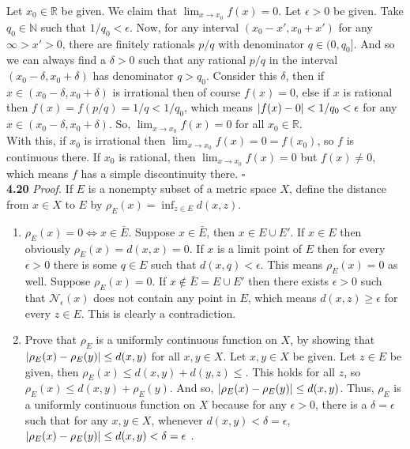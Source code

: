 \documentclass[11pt]{article}
\begin{document}
Let $x_0 \in \mathbb{R}$ be given. We claim that $\lim_{x\to x_0}f(x) = 0$. Let $\epsilon > 0$ be given. Take $q_0 \in \mathbb{N}$ such that $1/q_0 < \epsilon$. Now, for any interval $(x_0-x', x_0+x')$ for any $\infty> x' >0$, there are finitely rationals $p/q$ with denominator $ q \in (0, q_0]$. And so we can always find a $\delta > 0$ such that any rational $p/q$ in the interval $(x_0 - \delta, x_0 + \delta)$ has denominator $q > q_0$. Consider this $\delta$, then if $x \in (x_0-\delta, x_0 + \delta)$ is irrational then of course $f(x) = 0$, else if $x$ is rational then $f(x) = f(p/q) = 1/q < 1/q_0$, which means $\abs{f(x) - 0} < 1/q_0 < \epsilon$ for any $x \in (x_0 - \delta, x_0 + \delta)$. So, $\lim_{x\to x_0}f(x) = 0$ for all $x_0 \in \mathbb{R}$. \\

With this, if $x_0$ is irrational then $\lim_{x\to x_0} f(x) = 0 = f(x_0)$, so $f$ is continuous there. If $x_0$ is rational, then $\lim_{x\to x_0}f(x) = 0$ but $f(x) \neq 0$, which means $f$ has a simple discontinuity there. \hfill $\square$\\





\noindent \textbf{4.20}
\noindent \textit{Proof.} If $E$ is a nonempty subset of a metric space $X$, define the distance from $x\in X$ to $E$ by $\rho_E(x) = \inf_{z\in E} d(x,z)$.


\begin{enumerate}
	\item $\rho_E(x) = 0 \iff x\in \bar{E}$. Suppose $x\in \bar{E}$, then $x \in E \cup E'$. If $x\in E$ then obviously $\rho_E(x) = d(x,x) = 0$. If $x$ is a limit point of $E$ then for every $\epsilon > 0$ there is some $q \in E$ such that $d(x,q) < \epsilon$. This means $\rho_E(x) = 0$ as well. Suppose $\rho_E (x) = 0$. If $x \notin \bar{E} = E \cup E'$ then there exists $\epsilon > 0$ such that $\mathcal{N}_\epsilon(x)$ does not contain any point in $E$, which means $d(x,z) \geq \epsilon$ for every $z \in E$. This is clearly a contradiction.  
	
	
	
	\item Prove that $\rho_E$ is a uniformly continuous function on $X$, by showing that $\abs{\rho_E(x) - \rho_E(y)} \leq d(x,y)$ for all $x, y \in X$. Let $x,y\in X$ be given. Let $z \in E$ be given, then $\rho_E(x) \leq d(x,y) + d(y,z) \leq $. This holds for all $z$, so $\rho_E(x) \leq d(x,y) + \rho_E(y)$. And so, $\abs{\rho_E(x) - \rho_E(y)} \leq d(x,y)$. Thus, $\rho_E$ is a uniformly continuous function on $X$ because for any $\epsilon >0$, there is a $\delta = \epsilon$ such that for any $x,y \in X$,  whenever $d(x,y) < \delta = \epsilon$, $\abs{\rho_E(x)  - \rho_E(y)} \leq d(x,y) < \delta = \epsilon$ .
	
	
	
	
	
	
	 
\end{enumerate}
\end{document}
